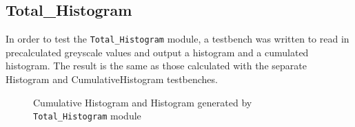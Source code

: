 \documentclass[12pt]{article}
\begin{document}
  \subsection{Total\_Histogram}
    In order to test the \texttt{Total\_Histogram} module, a testbench was written to read in precalculated greyscale values and output a histogram and a cumulated histogram. The result is the same as those calculated with the separate Histogram and CumulativeHistogram testbenches.
  \begin{figure}[H]
    \caption{Cumulative Histogram and Histogram generated by \texttt{Total\_Histogram} module}
    \label{fig:cumulative_histogram_testbench}
  \end{figure} 
  
\newpage
\end{document}
